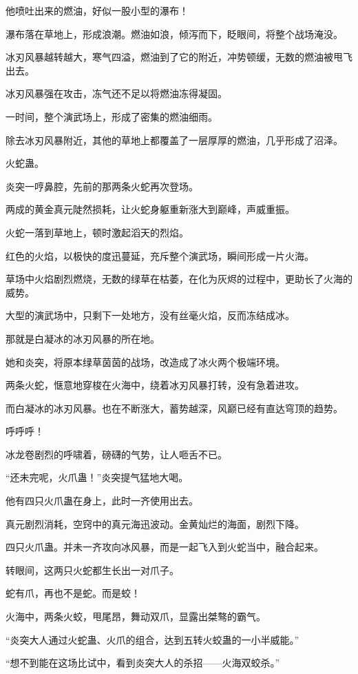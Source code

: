 \begin{this_body}
他喷吐出来的燃油，好似一股小型的瀑布！

瀑布落在草地上，形成浪潮。燃油如浪，倾泻而下，眨眼间，将整个战场淹没。

冰刃风暴越转越大，寒气四溢，燃油到了它的附近，冲势顿缓，无数的燃油被甩飞出去。

冰刃风暴强在攻击，冻气还不足以将燃油冻得凝固。

一时间，整个演武场上，形成了密集的燃油细雨。

除去冰刃风暴附近，其他的草地上都覆盖了一层厚厚的燃油，几乎形成了沼泽。

火蛇蛊。

炎突一哼鼻腔，先前的那两条火蛇再次登场。

两成的黄金真元陡然损耗，让火蛇身躯重新涨大到巅峰，声威重振。

火蛇一落到草地上，顿时激起滔天的烈焰。

红色的火焰，以极快的度迅蔓延，充斥整个演武场，瞬间形成一片火海。

草场中火焰剧烈燃烧，无数的绿草在枯萎，在化为灰烬的过程中，更助长了火海的威势。

大型的演武场中，只剩下一处地方，没有丝毫火焰，反而冻结成冰。

那就是白凝冰的冰刃风暴的所在地。

她和炎突，将原本绿草茵茵的战场，改造成了冰火两个极端环境。

两条火蛇，惬意地穿梭在火海中，绕着冰刃风暴打转，没有急着进攻。

而白凝冰的冰刃风暴。也在不断涨大，蓄势越深，风巅已经有直达穹顶的趋势。

呼呼呼！

冰龙卷剧烈的呼啸着，磅礴的气势，让人咂舌不已。

“还未完呢，火爪蛊！”炎突提气猛地大喝。

他有四只火爪蛊在身上，此时一齐使用出去。

真元剧烈消耗，空窍中的真元海迅波动。金黄灿烂的海面，剧烈下降。

四只火爪蛊。并未一齐攻向冰风暴，而是一起飞入到火蛇当中，融合起来。

转眼间，这两只火蛇都生长出一对爪子。

蛇有爪，再也不是蛇。而是蛟！

火海中，两条火蛟，甩尾昂，舞动双爪，显露出桀骜的霸气。

“炎突大人通过火蛇蛊、火爪的组合，达到五转火蛟蛊的一小半威能。”

“想不到能在这场比试中，看到炎突大人的杀招——火海双蛟杀。”


\end{this_body}
